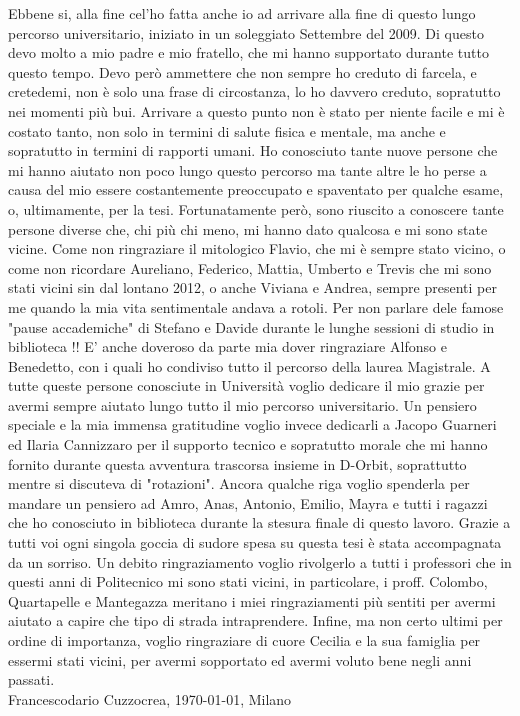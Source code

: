Ebbene si, alla fine cel'ho fatta anche io ad arrivare alla fine di questo lungo percorso universitario, iniziato in un soleggiato Settembre del 2009. Di questo devo molto a mio padre e mio fratello, che mi hanno supportato durante tutto questo tempo. Devo però ammettere che non sempre ho creduto di farcela, e cretedemi, non è solo una frase di circostanza, lo ho davvero creduto, sopratutto nei momenti più bui. Arrivare a questo punto non è stato per niente facile e mi è costato tanto, non solo in termini di salute fisica e mentale, ma anche e sopratutto in termini di rapporti umani. Ho conosciuto tante nuove persone che mi hanno aiutato non poco lungo questo percorso ma tante altre le ho perse a causa del mio essere costantemente preoccupato e spaventato per qualche esame, o, ultimamente, per la tesi. Fortunatamente però, sono riuscito a conoscere tante persone diverse che, chi più chi meno, mi hanno dato qualcosa e mi sono state vicine. Come non ringraziare il mitologico Flavio, che mi è sempre stato vicino, o come non ricordare Aureliano, Federico, Mattia, Umberto e Trevis che mi sono stati vicini sin dal lontano 2012, o anche Viviana e Andrea, sempre presenti per me quando la mia vita sentimentale andava a rotoli. Per non parlare dele famose "pause accademiche" di Stefano e Davide durante le lunghe sessioni di studio in biblioteca !! E' anche doveroso da parte mia dover ringraziare Alfonso e Benedetto, con i quali ho condiviso tutto il percorso della laurea Magistrale. A tutte queste persone conosciute in Università voglio dedicare il mio grazie per avermi sempre aiutato lungo tutto il mio percorso universitario. Un pensiero speciale e la mia immensa gratitudine voglio invece dedicarli a Jacopo Guarneri ed Ilaria Cannizzaro per il supporto tecnico e sopratutto morale che mi hanno fornito durante questa avventura trascorsa insieme in D-Orbit, soprattutto mentre si discuteva di "rotazioni". Ancora qualche riga voglio spenderla per mandare un pensiero ad Amro, Anas, Antonio, Emilio, Mayra e tutti i ragazzi che ho conosciuto in biblioteca durante la stesura finale di questo lavoro. Grazie a tutti voi ogni singola goccia di sudore spesa su questa tesi è stata accompagnata da un sorriso. Un debito ringraziamento voglio rivolgerlo a tutti i professori che in questi anni di Politecnico mi sono stati vicini, in particolare, i proff. Colombo, Quartapelle e Mantegazza meritano i miei ringraziamenti più sentiti per avermi aiutato a capire che tipo di strada intraprendere.
Infine, ma non certo ultimi per ordine di importanza, voglio ringraziare di cuore Cecilia e la sua famiglia per essermi stati vicini, per avermi sopportato ed avermi voluto bene negli anni passati.\\


Francescodario Cuzzocrea, \today, Milano